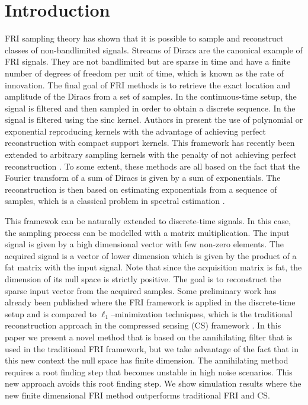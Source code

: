 \documentclass{article}
\begin{document}
\section{Introduction}
\label{sec:intro}


FRI sampling theory \cite{vetterli2002,blu2008,berent2010,tur2011} has shown that it is possible to sample
and reconstruct classes of non-bandlimited signals.
Streams of Diracs are the canonical example of FRI signals. They are not bandlimited but 
are sparse in time and have a finite number of degrees of freedom per unit of time, which is 
known as the rate of innovation. The final goal of FRI methods is to retrieve the exact 
location and amplitude of the Diracs from a set of samples. 
In the continuous-time setup, the signal is filtered and then sampled in order to obtain a 
discrete sequence.
In \cite{vetterli2002} the signal is filtered using the sinc kernel. Authors 
in \cite{dragotti2007} present the use of polynomial or exponential reproducing kernels with
the advantage of achieving perfect reconstruction with compact support kernels. 
This framework has recently been extended to arbitrary sampling kernels with the penalty of 
not achieving perfect reconstruction \cite{uriguen2013}. 
To some extent, these methods are all based on the fact that 
the Fourier transform of a sum of Diracs is given by a sum of exponentials.
The reconstruction is then based on estimating exponentials from a sequence of samples, which is a 
classical problem in spectral estimation \cite{rao1992,stoica2005}. 

This framewok can be naturally extended to discrete-time signals. In this case, the sampling 
process can be modelled with a matrix multiplication. The input signal is given by a high dimensional
vector with few non-zero elements. The acquired signal is a vector of lower dimension which is given 
by the product of a fat matrix with the input signal. Note that since the acquisition matrix is fat, 
the dimension of its null space is strictly positive. 
The goal is to reconstruct the sparse input vector from the acquired samples. 
Some preliminary work has already been published where the FRI framework is applied in the 
discrete-time setup \cite{hormati2007} and is compared to $\ell_1$--minimization techniques,
which is the traditional reconstruction approach in the compressed sensing (CS) framework \cite{donoho2006,candes2006}.
In this paper we present a novel method that is based on the annihilating filter 
that is used in the traditional FRI framework, but we take advantage of the fact that 
in this new context the null space has finite dimension. 
The annihilating method requires a root finding 
step that becomes unstable in high noise scenarios. This new approach avoids this root finding step. 
We show simulation results where the new finite dimensional FRI method outperforms traditional FRI and CS.
\end{document}
